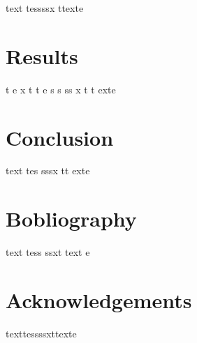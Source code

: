 \documentclass[
  ams,
  uplatex]{U-AizuGT}
\begin{document}
    text tessssx ttexte
    
    \hypertarget{results}{%
    \section{Results}\label{results}}
    
    t e x t t e s s ss x t t exte
    
    \hypertarget{conclusion}{%
    \section{Conclusion}\label{conclusion}}
    
    text tes sssx tt exte
    
    \hypertarget{bobliography}{%
    \section{Bobliography}\label{bobliography}}
    
    text tess ssxt text e
    
    \hypertarget{acknowledgements}{%
    \section{Acknowledgements}\label{acknowledgements}}
    
    texttessssxttexte

        
    
\end{document}
